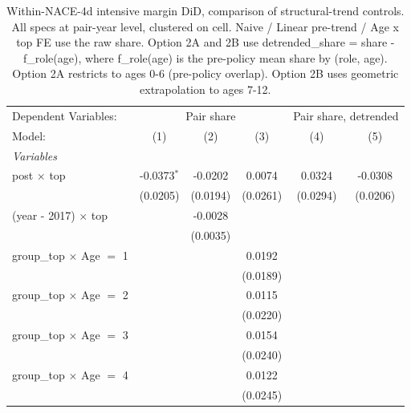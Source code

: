 
\begin{table}[htbp]
   \caption{\label{tab:phase4_within_intensive_did_prepolicy_baseline} Within-NACE-4d intensive margin DiD, comparison of structural-trend controls. All specs at pair-year level, clustered on cell. Naive / Linear pre-trend / Age x top FE use the raw share. Option 2A and 2B use detrended\_share = share - f\_role(age), where f\_role(age) is the pre-policy mean share by (role, age). Option 2A restricts to ages 0-6 (pre-policy overlap). Option 2B uses geometric extrapolation to ages 7-12.}
   \centering
   \begin{tabular}{lccccc}
      \tabularnewline \midrule \midrule
      Dependent Variables: & \multicolumn{3}{c}{Pair share} & \multicolumn{2}{c}{Pair share, detrended}\\
      Model:                           & (1)           & (2)      & (3)      & (4)      & (5)\\  
      \midrule
      \emph{Variables}\\
      post $\times$ top                & -0.0373$^{*}$ & -0.0202  & 0.0074   & 0.0324   & -0.0308\\   
                                       & (0.0205)      & (0.0194) & (0.0261) & (0.0294) & (0.0206)\\   
      (year - 2017) $\times$ top       &               & -0.0028  &          &          &   \\   
                                       &               & (0.0035) &          &          &   \\   
      group\_top $\times$ Age $=$ 1    &               &          & 0.0192   &          &   \\   
                                       &               &          & (0.0189) &          &   \\   
      group\_top $\times$ Age $=$ 2    &               &          & 0.0115   &          &   \\   
                                       &               &          & (0.0220) &          &   \\   
      group\_top $\times$ Age $=$ 3    &               &          & 0.0154   &          &   \\   
                                       &               &          & (0.0240) &          &   \\   
      group\_top $\times$ Age $=$ 4    &               &          & 0.0122   &          &   \\   
                                       &               &          & (0.0245) &          &   \\   

\end{tabular}
\end{table}
